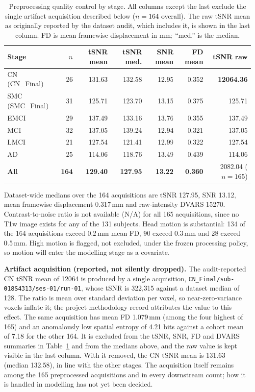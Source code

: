 \documentclass{ssnreview}
\begin{document}
\begin{table}[!htbp]
\centering
\caption[Preprocessing quality control by stage]{Preprocessing quality control by stage. All columns except the last exclude
the single artifact acquisition described below ($n=164$ overall). The raw tSNR mean as
originally reported by the dataset audit, which includes it, is shown in the last
column.
FD is mean framewise displacement in mm; ``med.'' is the median.}
\label{tab:groupqc}
\footnotesize
\setlength{\tabcolsep}{2.5pt}
\begin{tabular}{@{}lrrrrrr@{}}
\toprule
\textbf{Stage} & \textbf{$n$} & \textbf{tSNR mean} & \textbf{tSNR med.} &
\textbf{SNR mean} & \textbf{FD mean} & \textbf{tSNR raw} \\
\midrule
CN (CN\_Final) & 26 & 131.63 & 132.58 & 12.95 & 0.352 & \textbf{12064.36} \\
SMC (SMC\_Final) & 31 & 125.71 & 123.70 & 13.15 & 0.375 & 125.71 \\
EMCI & 29 & 137.49 & 133.16 & 13.76 & 0.355 & 137.49 \\
MCI & 32 & 137.05 & 139.24 & 12.94 & 0.321 & 137.05 \\
LMCI & 21 & 127.54 & 121.41 & 12.99 & 0.322 & 127.54 \\
AD & 25 & 114.06 & 118.76 & 13.49 & 0.439 & 114.06 \\
\midrule
\textbf{All} & \textbf{164} & \textbf{129.40} & \textbf{127.95} & \textbf{13.22} &
\textbf{0.360} & 2082.04 ($n=165$) \\
\bottomrule
\end{tabular}
\end{table}

Dataset-wide medians over the 164 acquisitions are tSNR 127.95, SNR 13.12, mean
framewise displacement 0.317\,mm and raw-intensity DVARS 15270. Contrast-to-noise
ratio is not available (N/A) for all 165 acquisitions, since no T1w image exists for
any of the 131 subjects. Head motion is substantial: 134 of the 164 acquisitions
exceed 0.2\,mm mean FD, 90 exceed 0.3\,mm and 28 exceed 0.5\,mm. High motion is
flagged, not excluded, under the frozen processing policy, so motion will enter the
modelling stage as a covariate.

\textbf{Artifact acquisition (reported, not silently dropped).} The audit-reported
CN tSNR mean of 12064 is produced by a single acquisition,
\texttt{CN\_Final/\allowbreak sub-018S4313/\allowbreak ses-01/\allowbreak run-01}, whose tSNR is 322,315 against a
dataset median of 128. The ratio is mean over standard deviation per voxel, so
near-zero-variance voxels inflate it; the project methodology record attributes the
value to this effect. The same acquisition has mean FD 1.079\,mm (among the four
highest of 165) and an anomalously low spatial entropy of 4.21 bits against a
cohort mean of 7.18 for the other 164. It is excluded from the tSNR, SNR, FD and
DVARS summaries in Table~\ref{tab:groupqc} and from the medians above, and the raw
value is kept visible in the last column. With it removed, the CN tSNR mean is 131.63
(median 132.58), in line with the other stages. The acquisition itself remains among the 165
preprocessed acquisitions and in every downstream count; how it is handled in
modelling has not yet been decided.
\end{document}
